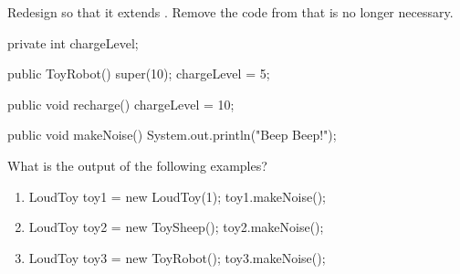 \newpage

\Q \label{key1}
Redesign  so that it extends .
Remove the code from  that is no longer necessary.

\begin{javalst}
public class ToyRobot extends LoudToy {
\end{javalst}
\vspace{-1ex}
\begin{answer}[20em]
\begin{javaans}
    private int chargeLevel;

    public ToyRobot() {
        super(10);
        chargeLevel = 5;
    }

    public void recharge() {
        chargeLevel = 10;
    }

    public void makeNoise() {
        System.out.println("Beep Beep!");
    }
\end{javaans}
\end{answer}
\vspace{-1ex}
\begin{javalst}
}
\end{javalst}


\Q What is the output of the following examples?

\begin{enumerate}

\item
\begin{javalst}
LoudToy toy1 = new LoudToy(1);
toy1.makeNoise();
\end{javalst}

\vspace{-2.5em} \hspace{18em} 

\item
\begin{javalst}
LoudToy toy2 = new ToySheep();
toy2.makeNoise();
\end{javalst}

\vspace{-2.5em} \hspace{18em} 

\item
\begin{javalst}
LoudToy toy3 = new ToyRobot();
toy3.makeNoise();
\end{javalst}

\vspace{-2.5em} \hspace{18em} 

\end{enumerate}


